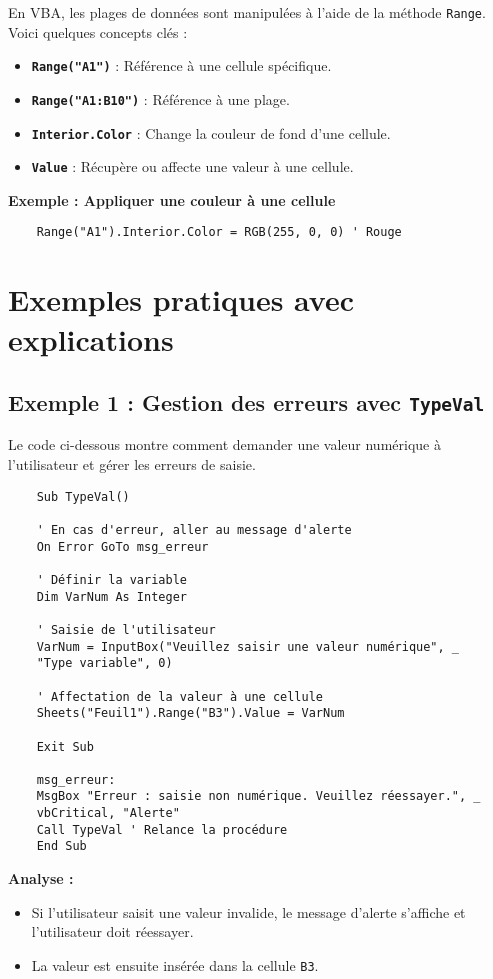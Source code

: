\documentclass[a4paper,12pt]{report}
\begin{document}
En VBA, les plages de données sont manipulées à l'aide de la méthode \texttt{Range}. Voici quelques concepts clés :
\begin{itemize}
	\item \textbf{\texttt{Range("A1")}} : Référence à une cellule spécifique.
	\item \textbf{\texttt{Range("A1:B10")}} : Référence à une plage.
	\item \textbf{\texttt{Interior.Color}} : Change la couleur de fond d'une cellule.
	\item \textbf{\texttt{Value}} : Récupère ou affecte une valeur à une cellule.
\end{itemize}

\textbf{Exemple : Appliquer une couleur à une cellule}
\begin{lstlisting}
	Range("A1").Interior.Color = RGB(255, 0, 0) ' Rouge
\end{lstlisting}

\section{Exemples pratiques avec explications}

\subsection{Exemple 1 : Gestion des erreurs avec \texttt{TypeVal}}

Le code ci-dessous montre comment demander une valeur numérique à l'utilisateur et gérer les erreurs de saisie.

\begin{lstlisting}
	Sub TypeVal()
	
	' En cas d'erreur, aller au message d'alerte
	On Error GoTo msg_erreur
	
	' Définir la variable
	Dim VarNum As Integer
	
	' Saisie de l'utilisateur
	VarNum = InputBox("Veuillez saisir une valeur numérique", _
	"Type variable", 0)
	
	' Affectation de la valeur à une cellule
	Sheets("Feuil1").Range("B3").Value = VarNum
	
	Exit Sub
	
	msg_erreur:
	MsgBox "Erreur : saisie non numérique. Veuillez réessayer.", _
	vbCritical, "Alerte"
	Call TypeVal ' Relance la procédure
	End Sub
\end{lstlisting}

\textbf{Analyse :}
\begin{itemize}
	\item Si l'utilisateur saisit une valeur invalide, le message d'alerte s'affiche et l'utilisateur doit réessayer.
	\item La valeur est ensuite insérée dans la cellule \texttt{B3}.
\end{itemize}
\end{document}
